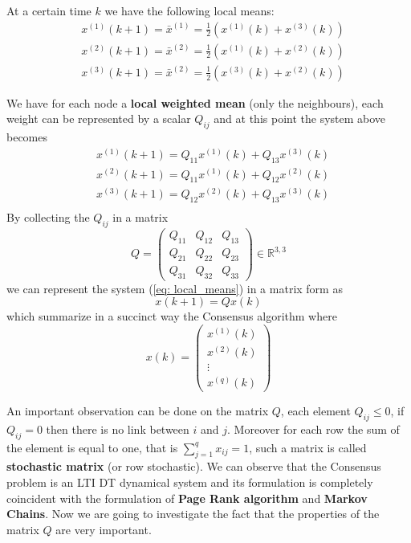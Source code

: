 At a certain time $k$ we have the following local means:
\begin{equation}    \label{eq: local_means}
    \begin{aligned}
        &x^{(1)}(k+1)=\bar{x}^{(1)} = \frac{1}{2} (x^{(1)}(k)+x^{(3)}(k))\\
        &x^{(2)}(k+1)=\bar{x}^{(2)} = \frac{1}{2} (x^{(1)}(k)+x^{(2)}(k))\\
        &x^{(3)}(k+1)=\bar{x}^{(2)} = \frac{1}{2} (x^{(3)}(k)+x^{(2)}(k))
    \end{aligned}
\end{equation}

\noindent
We have for each node a \textbf{local weighted mean} (only the neighbours), each weight can be represented by a scalar $Q_{ij}$ and at this point the system above becomes
\begin{equation}
    \begin{aligned}
        &x^{(1)}(k+1)= Q_{11} x^{(1)}(k)+Q_{13}x^{(3)}(k)\\
        &x^{(2)}(k+1)= Q_{11} x^{(1)}(k)+Q_{12}x^{(2)}(k)\\
        &x^{(3)}(k+1)= Q_{12} x^{(2)}(k)+Q_{13}x^{(3)}(k)\\
    \end{aligned}
\end{equation}
By collecting the $Q_{ij}$ in a matrix 
$$Q=\begin{pmatrix}
    Q_{11}&Q_{12}&Q_{13}\\
    Q_{21}&Q_{22}&Q_{23}\\
    Q_{31}&Q_{32}&Q_{33}
\end{pmatrix}
    \in\mathbb{R}^{3,3}$$
we can represent the system (\ref{eq: local_means}) in a matrix form as
\begin{equation}
    x(k+1)=Qx(k)
\end{equation}
which summarize in a succinct way the Consensus algorithm where
$$x(k)=\begin{pmatrix} x^{(1)}(k)\\x^{(2)}(k)\\\vdots\\x^{(q)}(k) \end{pmatrix}$$ 

An important observation can be done on the matrix $Q$, each element $Q_{ij}\le 0$, if $Q_{ij}=0$ then there is no link between $i$ and $j$. Moreover for each row the sum of the element is equal to one, that is $\sum_{j=1}^q x_{ij}=1$, such a matrix is called \textbf{stochastic matrix} (or row stochastic). We can observe that the Consensus problem is an LTI DT dynamical system and its formulation is completely coincident with the formulation of \textbf{Page Rank algorithm} and \textbf{Markov Chains}. Now we are going to investigate the fact that the properties of the matrix $Q$ are very important.

